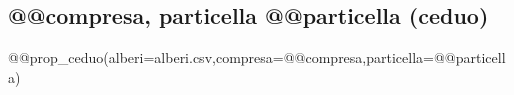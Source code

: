 \begin{minipage}{\textwidth}
\subsection*{@@compresa, particella @@particella (ceduo)}

{\footnotesize
@@prop_ceduo(alberi=alberi.csv,compresa=@@compresa,particella=@@particella)
\vspace{2\baselineskip}
}
\end{minipage}
